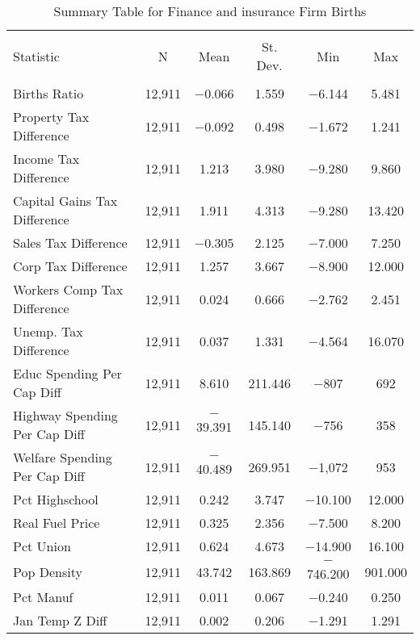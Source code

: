 
\begin{table}[!htbp] \centering 
  \caption{Summary Table for  Finance and insurance Firm Births} 
  \label{52summary} 
\begin{tabular}{@{\extracolsep{5pt}}lccccc} 
\\[-1.8ex]\hline 
\hline \\[-1.8ex] 
Statistic & \multicolumn{1}{c}{N} & \multicolumn{1}{c}{Mean} & \multicolumn{1}{c}{St. Dev.} & \multicolumn{1}{c}{Min} & \multicolumn{1}{c}{Max} \\ 
\hline \\[-1.8ex] 
Births Ratio & 12,911 & $-$0.066 & 1.559 & $-$6.144 & 5.481 \\ 
Property Tax Difference & 12,911 & $-$0.092 & 0.498 & $-$1.672 & 1.241 \\ 
Income Tax Difference & 12,911 & 1.213 & 3.980 & $-$9.280 & 9.860 \\ 
Capital Gains Tax Difference & 12,911 & 1.911 & 4.313 & $-$9.280 & 13.420 \\ 
Sales Tax Difference & 12,911 & $-$0.305 & 2.125 & $-$7.000 & 7.250 \\ 
Corp Tax Difference & 12,911 & 1.257 & 3.667 & $-$8.900 & 12.000 \\ 
Workers Comp Tax Difference & 12,911 & 0.024 & 0.666 & $-$2.762 & 2.451 \\ 
Unemp. Tax Difference & 12,911 & 0.037 & 1.331 & $-$4.564 & 16.070 \\ 
Educ Spending Per Cap Diff & 12,911 & 8.610 & 211.446 & $-$807 & 692 \\ 
Highway Spending Per Cap Diff & 12,911 & $-$39.391 & 145.140 & $-$756 & 358 \\ 
Welfare Spending Per Cap Diff & 12,911 & $-$40.489 & 269.951 & $-$1,072 & 953 \\ 
Pct Highschool & 12,911 & 0.242 & 3.747 & $-$10.100 & 12.000 \\ 
Real Fuel Price & 12,911 & 0.325 & 2.356 & $-$7.500 & 8.200 \\ 
Pct Union & 12,911 & 0.624 & 4.673 & $-$14.900 & 16.100 \\ 
Pop Density & 12,911 & 43.742 & 163.869 & $-$746.200 & 901.000 \\ 
Pct Manuf & 12,911 & 0.011 & 0.067 & $-$0.240 & 0.250 \\ 
Jan Temp Z Diff & 12,911 & 0.002 & 0.206 & $-$1.291 & 1.291 \\ 

\end{tabular}
\end{table}
